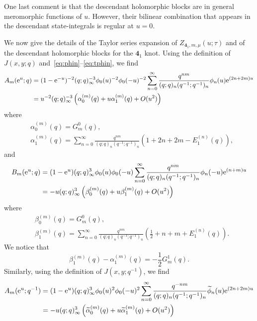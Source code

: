 \documentclass[12pt,reqno]{amsart}
\theoremstyle{definition}
\def\wt{\widetilde}
\def\re{{\rm e}}
\def\md{\mathbf}
\def\cO{O}
\newcommand{\knot}[1]{\md{#1}}
\newcommand{\nn}{\nonumber \\}
\begin{document}
One last comment is that the descendant holomorphic blocks are in
general meromorphic functions of $u$. However, their bilinear
combination that appears in the descendant state-integrals is regular
at $u=0$.

We now give the details of the Taylor series expansion of
$Z_{\knot{4}_1,m,\mu}(u;\tau)$ and of the descendant holomorphic
blocks for the $\knot{4}_1$ knot.
Using the definition of $J(x,y;q)$ and~\eqref{eq:phin}--\eqref{eq:tphin},
we find
\begin{align}
  A_m(\re^u;q)
  &= (1-\re^{-u})^{-2}(q;q)_\infty^{-3}\phi_0(u)^{-2}\phi_0(-u)^{-2}
  \sum_{n=0}^\infty \frac{q^{nm}}{(q;q)_n(q^{-1};q^{-1})_n}
    \phi_n(u) \re^{(2n+2m)u} \nn
  &= u^{-2}(q;q)_\infty^{-3}
    \left(\alpha^{(m)}_0(q)+u\alpha^{(m)}_1(q)+\cO(u^2)\right)
\label{eq:A-uexp-41}
\end{align}
where
\begin{subequations}
\begin{align}
  &\alpha^{(m)}_0(q) = G_m^0(q),\label{eq:a0-41}\\
  &\alpha^{(m)}_1(q) =
    \sum_{n=0}^\infty \frac{q^{nm}}{(q;q)_n(q^{-1};q^{-1})_n}
    (1+2n+2m-E_1^{(n)}(q)),\label{eq:a1-41}
\end{align}
\end{subequations}
and
\begin{align}
  B_m(\re^u;q)
  &= (1-\re^u)(q;q)_\infty^3\phi_0(u)\phi_0(-u)
    \sum_{n=0}^\infty \frac{q^{nm}}
    {(q;q)_n(q^{-1};q^{-1})_n}
    \phi_n(-u) \re^{(n+m)u} \nn
  &= -u(q;q)_\infty^3
    \left(\beta^{(m)}_0(q)+u\beta^{(m)}_1(q)+\cO(u^2)\right)
    \label{eq:B-uexp-41}
\end{align}
where
\begin{subequations}
\begin{align}
  &\beta^{(m)}_0(q) = G_m^0(q),\label{eq:b0-41}\\
  &\beta^{(m)}_1(q) =
    \sum_{n=0}^\infty \frac{q^{nm}}{(q;q)_n(q^{-1};q^{-1})_n}
    \left(\frac{1}{2}+n+m+E_1^{(n)}(q)\right).\label{eq:b1-41}
\end{align}
\end{subequations}
We notice that
\begin{equation}
  \beta^{(m)}_1(q) -\alpha^{(m)}_1(q) =
  -\frac{1}{2} G_m^1(q).
\end{equation}
Similarly, using the definition of $J(x,y;q^{-1})$, we find
\begin{align}
  A_m(\re^u;q^{-1})
  &=
    (1-\re^u)(q;q)_\infty^3\phi_0(u)^2\phi_0(-u)^2
    \sum_{n=0}^\infty\frac{q^{-nm}}{(q;q)_n(q^{-1};q^{-1})_n}
    \wt{\phi}_n(u)\re^{(2n+2m)u} \nn
  &=
    -u(q;q)_\infty^3\left(\wt{\alpha}^{(m)}_0(q)+u
    \wt{\alpha}^{(m)}_1(q) + \cO(u^2)\right)
    \label{eq:tA-uexp-41}
\end{align}
\end{document}
